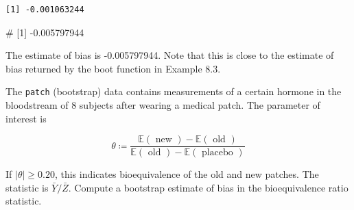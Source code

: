 \documentclass[
  letterpaper,
  DIV=11,
  numbers=noendperiod]{scrreprt}
\newenvironment{Shaded}{\begin{snugshade}}{\end{snugshade}}
\newcommand{\AttributeTok}[1]{\textcolor[rgb]{0.40,0.45,0.13}{#1}}
\newcommand{\CommentTok}[1]{\textcolor[rgb]{0.37,0.37,0.37}{#1}}
\newcommand{\ConstantTok}[1]{\textcolor[rgb]{0.56,0.35,0.01}{#1}}
\newcommand{\ControlFlowTok}[1]{\textcolor[rgb]{0.00,0.23,0.31}{\textbf{#1}}}
\newcommand{\DecValTok}[1]{\textcolor[rgb]{0.68,0.00,0.00}{#1}}
\newcommand{\FunctionTok}[1]{\textcolor[rgb]{0.28,0.35,0.67}{#1}}
\newcommand{\NormalTok}[1]{\textcolor[rgb]{0.00,0.23,0.31}{#1}}
\newcommand{\OtherTok}[1]{\textcolor[rgb]{0.00,0.23,0.31}{#1}}
\newcommand{\SpecialCharTok}[1]{\textcolor[rgb]{0.37,0.37,0.37}{#1}}
\begin{document}
\begin{Shaded}
\end{Shaded}

\begin{verbatim}
[1] -0.001063244
\end{verbatim}

\begin{Shaded}
\begin{Highlighting}[]
\CommentTok{\# [1] {-}0.005797944}
\end{Highlighting}
\end{Shaded}

The estimate of bias is -0.005797944. Note that this is close to the
estimate of bias returned by the boot function in Example 8.3.

The \texttt{patch} (bootstrap) data contains measurements of a certain
hormone in the bloodstream of 8 subjects after wearing a medical patch.
The parameter of interest is

\[
\theta\coloneqq\frac{\mathbb E(\text { new })-\mathbb E(\text { old })}{\mathbb E(\text { old })-\mathbb E(\text { placebo })}
\]

If \(|\theta| \ge 0.20\), this indicates bioequivalence of the old and
new patches. The statistic is \(\bar{Y} /\bar{Z}\). Compute a bootstrap
estimate of bias in the bioequivalence ratio statistic.
\end{document}
